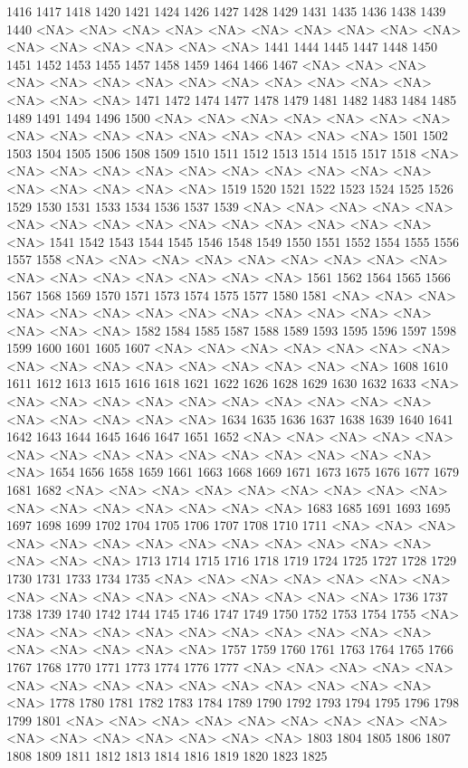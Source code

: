 \documentclass{article}
\begin{document}
\begin{Schunk}
\begin{Soutput}
1416 1417 1418 1420 1421 1424 1426 1427 1428 1429 1431 1435 1436 1438 1439 1440 
<NA> <NA> <NA> <NA> <NA> <NA> <NA> <NA> <NA> <NA> <NA> <NA> <NA> <NA> <NA> <NA> 
1441 1444 1445 1447 1448 1450 1451 1452 1453 1455 1457 1458 1459 1464 1466 1467 
<NA> <NA> <NA> <NA> <NA> <NA> <NA> <NA> <NA> <NA> <NA> <NA> <NA> <NA> <NA> <NA> 
1471 1472 1474 1477 1478 1479 1481 1482 1483 1484 1485 1489 1491 1494 1496 1500 
<NA> <NA> <NA> <NA> <NA> <NA> <NA> <NA> <NA> <NA> <NA> <NA> <NA> <NA> <NA> <NA> 
1501 1502 1503 1504 1505 1506 1508 1509 1510 1511 1512 1513 1514 1515 1517 1518 
<NA> <NA> <NA> <NA> <NA> <NA> <NA> <NA> <NA> <NA> <NA> <NA> <NA> <NA> <NA> <NA> 
1519 1520 1521 1522 1523 1524 1525 1526 1529 1530 1531 1533 1534 1536 1537 1539 
<NA> <NA> <NA> <NA> <NA> <NA> <NA> <NA> <NA> <NA> <NA> <NA> <NA> <NA> <NA> <NA> 
1541 1542 1543 1544 1545 1546 1548 1549 1550 1551 1552 1554 1555 1556 1557 1558 
<NA> <NA> <NA> <NA> <NA> <NA> <NA> <NA> <NA> <NA> <NA> <NA> <NA> <NA> <NA> <NA> 
1561 1562 1564 1565 1566 1567 1568 1569 1570 1571 1573 1574 1575 1577 1580 1581 
<NA> <NA> <NA> <NA> <NA> <NA> <NA> <NA> <NA> <NA> <NA> <NA> <NA> <NA> <NA> <NA> 
1582 1584 1585 1587 1588 1589 1593 1595 1596 1597 1598 1599 1600 1601 1605 1607 
<NA> <NA> <NA> <NA> <NA> <NA> <NA> <NA> <NA> <NA> <NA> <NA> <NA> <NA> <NA> <NA> 
1608 1610 1611 1612 1613 1615 1616 1618 1621 1622 1626 1628 1629 1630 1632 1633 
<NA> <NA> <NA> <NA> <NA> <NA> <NA> <NA> <NA> <NA> <NA> <NA> <NA> <NA> <NA> <NA> 
1634 1635 1636 1637 1638 1639 1640 1641 1642 1643 1644 1645 1646 1647 1651 1652 
<NA> <NA> <NA> <NA> <NA> <NA> <NA> <NA> <NA> <NA> <NA> <NA> <NA> <NA> <NA> <NA> 
1654 1656 1658 1659 1661 1663 1668 1669 1671 1673 1675 1676 1677 1679 1681 1682 
<NA> <NA> <NA> <NA> <NA> <NA> <NA> <NA> <NA> <NA> <NA> <NA> <NA> <NA> <NA> <NA> 
1683 1685 1691 1693 1695 1697 1698 1699 1702 1704 1705 1706 1707 1708 1710 1711 
<NA> <NA> <NA> <NA> <NA> <NA> <NA> <NA> <NA> <NA> <NA> <NA> <NA> <NA> <NA> <NA> 
1713 1714 1715 1716 1718 1719 1724 1725 1727 1728 1729 1730 1731 1733 1734 1735 
<NA> <NA> <NA> <NA> <NA> <NA> <NA> <NA> <NA> <NA> <NA> <NA> <NA> <NA> <NA> <NA> 
1736 1737 1738 1739 1740 1742 1744 1745 1746 1747 1749 1750 1752 1753 1754 1755 
<NA> <NA> <NA> <NA> <NA> <NA> <NA> <NA> <NA> <NA> <NA> <NA> <NA> <NA> <NA> <NA> 
1757 1759 1760 1761 1763 1764 1765 1766 1767 1768 1770 1771 1773 1774 1776 1777 
<NA> <NA> <NA> <NA> <NA> <NA> <NA> <NA> <NA> <NA> <NA> <NA> <NA> <NA> <NA> <NA> 
1778 1780 1781 1782 1783 1784 1789 1790 1792 1793 1794 1795 1796 1798 1799 1801 
<NA> <NA> <NA> <NA> <NA> <NA> <NA> <NA> <NA> <NA> <NA> <NA> <NA> <NA> <NA> <NA> 
1803 1804 1805 1806 1807 1808 1809 1811 1812 1813 1814 1816 1819 1820 1823 1825 

\end{Soutput}
\end{Schunk}
\end{document}
